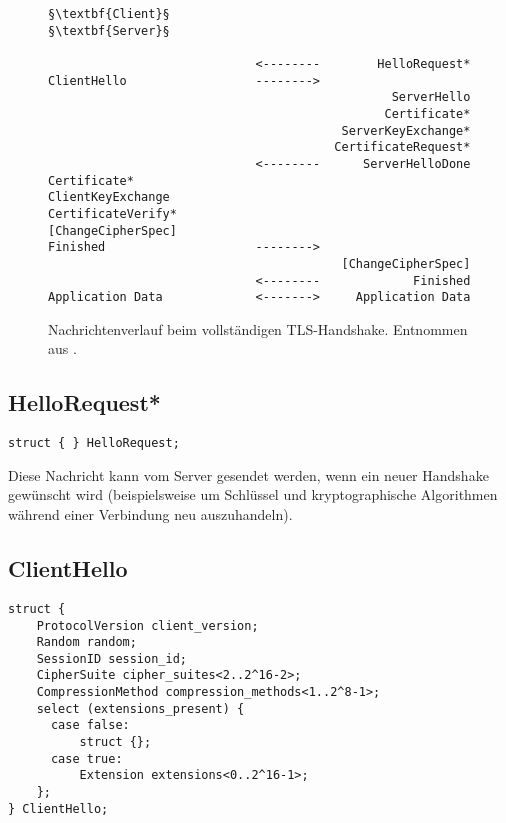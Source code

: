 
\lstset{
	style=default,
	frame=single
}
\begin{figure}[H]
	\centering
	\begin{lstlisting}
§\textbf{Client}§                                               §\textbf{Server}§

                             <--------        HelloRequest*
ClientHello                  -------->
                                                ServerHello
                                               Certificate*
                                         ServerKeyExchange*
                                        CertificateRequest*
                             <--------      ServerHelloDone
Certificate*
ClientKeyExchange
CertificateVerify*
[ChangeCipherSpec]
Finished                     -------->
                                         [ChangeCipherSpec]
                             <--------             Finished
Application Data             <------->     Application Data
	\end{lstlisting}
	\caption{Nachrichtenverlauf beim vollständigen TLS-Handshake. Entnommen aus \cite{tls12}.}
	\label{fig_complete_handshake}
\end{figure}
\lstset{style=tls}

\subsection{HelloRequest*}

\begin{lstlisting}
struct { } HelloRequest;
\end{lstlisting}

Diese Nachricht kann vom Server gesendet werden, wenn ein neuer Handshake gewünscht wird (beispielsweise um Schlüssel und kryptographische Algorithmen während einer Verbindung neu auszuhandeln).

\subsection{ClientHello}

\begin{lstlisting}
struct {
	ProtocolVersion client_version;
	Random random;
	SessionID session_id;
	CipherSuite cipher_suites<2..2^16-2>;
	CompressionMethod compression_methods<1..2^8-1>;
	select (extensions_present) {
	  case false:
	      struct {};
	  case true:
	      Extension extensions<0..2^16-1>;
	};
} ClientHello;
\end{lstlisting}

